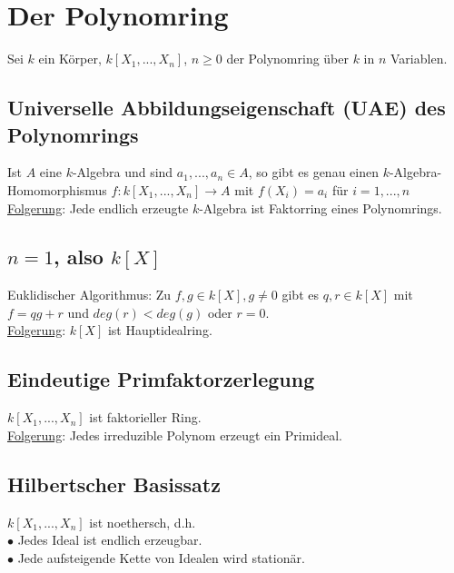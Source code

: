 \documentclass[a4paper,12pt]{report}
\theoremstyle{break}
\theoremstyle{nonumberbreak}
\theoremstyle{nonumberplain}
\begin{document}
\section{Der Polynomring}
Sei $k$ ein Körper, $k[X_1,...,X_n]$, $n\geq 0$ der Polynomring über $k$ in $n$ Variablen.
\subsection*{Universelle Abbildungseigenschaft (UAE) des Polynomrings}
Ist $A$ eine $k$-Algebra und sind $a_1,...,a_n\in A$, so gibt es genau einen $k$-Algebra-Homomorphismus $f: k[X_1,...,X_n] \rightarrow A$ mit $f(X_i)=a_i$ für $i= 1,...,n$\\
\underline{Folgerung}: Jede endlich erzeugte $k$-Algebra ist Faktorring eines Polynomrings.
\subsection*{$n=1$, also $k[X]$}
Euklidischer Algorithmus: Zu $f,g\in k[X], g\neq 0$ gibt es $q,r \in k[X]$ mit $f=qg+r$ und $deg(r)<deg(g)$ oder $r=0$.\\
\underline{Folgerung}: $k[X]$ ist Hauptidealring.
\subsection*{Eindeutige Primfaktorzerlegung}
$k[X_1,...,X_n]$ ist faktorieller Ring.\\
\underline{Folgerung}: Jedes irreduzible Polynom erzeugt ein Primideal.
\subsection*{Hilbertscher Basissatz}
$k[X_1,...,X_n]$ ist noethersch, d.h.\\
$\bullet$ Jedes Ideal ist endlich erzeugbar.\\
$\bullet$ Jede aufsteigende Kette von Idealen wird stationär.
\end{document}
